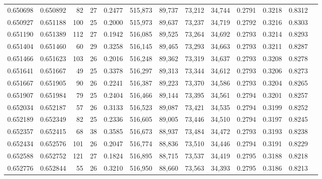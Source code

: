 \begin{tabular}{rrrrrrrrrrrrr}
0.650698 & 0.650892 &     82 &    27 &                                     0.2477 & 515,873 &  89,737 &  73,212 &  34,744 & 0.2791 & 0.3218 & 0.8312 \\
0.650927 & 0.651188 &    100 &    25 &                                     0.2000 & 515,973 &  89,637 &  73,237 &  34,719 & 0.2792 & 0.3216 & 0.8303 \\
0.651190 & 0.651389 &    112 &    27 &                                     0.1942 & 516,085 &  89,525 &  73,264 &  34,692 & 0.2793 & 0.3214 & 0.8293 \\
0.651404 & 0.651460 &     60 &    29 &                                     0.3258 & 516,145 &  89,465 &  73,293 &  34,663 & 0.2793 & 0.3211 & 0.8287 \\
0.651466 & 0.651623 &    103 &    26 &                                     0.2016 & 516,248 &  89,362 &  73,319 &  34,637 & 0.2793 & 0.3208 & 0.8278 \\
0.651641 & 0.651667 &     49 &    25 &                                     0.3378 & 516,297 &  89,313 &  73,344 &  34,612 & 0.2793 & 0.3206 & 0.8273 \\
0.651667 & 0.651905 &     90 &    26 &                                     0.2241 & 516,387 &  89,223 &  73,370 &  34,586 & 0.2793 & 0.3204 & 0.8265 \\
0.651907 & 0.651984 &     79 &    25 &                                     0.2404 & 516,466 &  89,144 &  73,395 &  34,561 & 0.2794 & 0.3201 & 0.8257 \\
0.652034 & 0.652187 &     57 &    26 &                                     0.3133 & 516,523 &  89,087 &  73,421 &  34,535 & 0.2794 & 0.3199 & 0.8252 \\
0.652189 & 0.652349 &     82 &    25 &                                     0.2336 & 516,605 &  89,005 &  73,446 &  34,510 & 0.2794 & 0.3197 & 0.8245 \\
0.652357 & 0.652415 &     68 &    38 &                                     0.3585 & 516,673 &  88,937 &  73,484 &  34,472 & 0.2793 & 0.3193 & 0.8238 \\
0.652434 & 0.652576 &    101 &    26 &                                     0.2047 & 516,774 &  88,836 &  73,510 &  34,446 & 0.2794 & 0.3191 & 0.8229 \\
0.652588 & 0.652752 &    121 &    27 &                                     0.1824 & 516,895 &  88,715 &  73,537 &  34,419 & 0.2795 & 0.3188 & 0.8218 \\
0.652776 & 0.652844 &     55 &    26 &                                     0.3210 & 516,950 &  88,660 &  73,563 &  34,393 & 0.2795 & 0.3186 & 0.8213 \\

\end{tabular}
